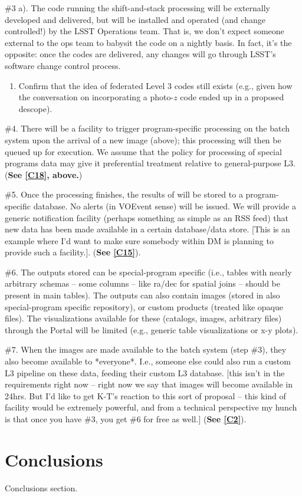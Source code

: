 \documentclass[DM,lsstdraft,toc]{lsstdoc}
\begin{document}
\#3 a). The code running the shift-and-stack processing will be externally developed and delivered, but will be installed and operated (and change controlled!) by the LSST Operations team. That is, we don't expect someone external to the ops team to babysit the code on a nightly basis. In fact, it's the opposite: once the codes are delivered, any changes will go through LSST's software change control process.
\begin{enumerate}[resume,topsep=-10pt,label= \textbf{Concern \Roman*.}] \item \label{C18} Confirm that the idea of federated Level 3 codes still exists (e.g., given how the conversation on incorporating a photo-$z$ code ended up in a proposed descope). \end{enumerate}

\#4. There will be a facility to trigger program-specific processing on the batch system upon the arrival of a new image (above); this processing will then be queued up for execution. We assume that the policy for processing of special programs data may give it preferential treatment relative to general-purpose L3. (\textbf{See \ref{C18}, above.})

\#5. Once the processing finishes, the results of will be stored to a program-specific database. No alerts (in VOEvent sense) will be issued. We will provide a generic notification facility (perhaps something as simple as an RSS feed) that new data has been made available in a certain database/data store. [This is an example where I'd want to make sure somebody within DM is planning to provide such a facility.]. (\textbf{See \ref{C15}}).

\#6. The outputs stored can be special-program specific (i.e., tables with nearly arbitrary schemas -- some columns -- like ra/dec for spatial joins -- should be present in main tables). The outputs can also contain images (stored in also special-program specific repository), or custom products (treated like opaque files). The visualizations available for these (catalogs, images, arbitrary files) through the Portal will be limited (e.g., generic table visualizations or x-y plots).

\#7. When the images are made available to the batch system (step \#3), they also become available to *everyone*. I.e., someone else could also run a custom L3 pipeline on these data, feeding their custom L3 database. [this isn't in the requirements right now -- right now we say that images will become available in 24hrs. But I'd like to get K-T's reaction to this sort of proposal -- this kind of facility would be extremely powerful, and from a technical perspective my hunch is that once you have \#3, you get \#6 for free as well.]
 (\textbf{See \ref{C2}}).


\section{Conclusions}\label{sec:conc}

Conclusions section.

%


\end{document}
